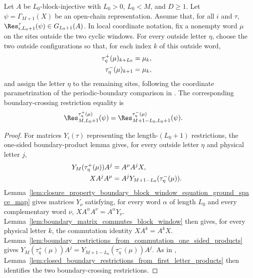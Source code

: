 \begin{lemma}
    \label{thm:closure_property_boundary_restrictions_ground_space_map}
    \leanok
    Let $A$ be $L_0$-block-injective with $L_0>0$, $L_0<M$, and
    $D\ge1$. Let $\psi=\Gamma_{M+1}(X)$ be an open-chain representation.
    Assume that, for all $i$ and $\tau$,
    $\Res^{\tau}_{i,L_0+1}(\psi)\in G_{L_0+1}(A)$.
    In local coordinate notation, fix a nonempty word $\mu$ on the sites outside
    the two cyclic windows. For every outside letter $\eta$, choose the two
    outside configurations so that, for each index $k$ of this outside word,
    \begin{align}
        \tau^+_\eta(\mu)_{k+L_0}
         & =
        \mu_k,
        \notag \\
        \tau^-_\eta(\mu)_{k+1}
         & =
        \mu_k,
        \notag
    \end{align}
    and assign the letter $\eta$ to the remaining sites, following the coordinate
    parametrization of the periodic-boundary comparison in
    \cite[Section~IV.C, lines~2078--2079]{Cirac2021Matrix}.
    The corresponding boundary-crossing restriction equality is
    \begin{align}
        \Res^{\tau^+_\eta(\mu)}_{M,L_0+1}(\psi)
         & =
        \Res^{\tau^-_\eta(\mu)}_{M+1-L_0,L_0+1}(\psi).
        \notag
    \end{align}
\end{lemma}

\begin{proof}
    \leanok
    For matrices $Y_i(\tau)$ representing the length-$(L_0+1)$ restrictions,
    the one-sided boundary-product lemma gives, for every outside letter $\eta$
    and physical letter $j$,
    \begin{align}
        Y_M(\tau^+_\eta(\mu))A^j
         & =
        A^\mu A^jX,
        \notag \\
        XA^jA^\mu
         & =
        A^jY_{M+1-L_0}(\tau^-_\eta(\mu)).
        \notag
    \end{align}
    Lemma~\ref{lem:closure_property_boundary_block_window_equation_ground_space_map}
    gives matrices $Y_\nu$ satisfying, for every word $\alpha$ of length $L_0$
    and every complementary word $\nu$,
    $XA^\alpha A^\nu = A^\alpha Y_\nu$.
    Lemma~\ref{lem:boundary_matrix_commutes_block_window} then gives, for every
    physical letter $k$, the commutation identity $XA^k=A^kX$.
    Lemma~\ref{lem:boundary_restrictions_from_commutation_one_sided_products}
    gives
    $Y_M(\tau^+_\eta(\mu))A^j = Y_{M+1-L_0}(\tau^-_\eta(\mu))A^j$.
    As in \cite[lines~2078--2079]{Cirac2021Matrix},
    Lemma~\ref{lem:closed_boundary_restrictions_from_first_letter_products}
    then identifies the two boundary-crossing restrictions.
\end{proof}

